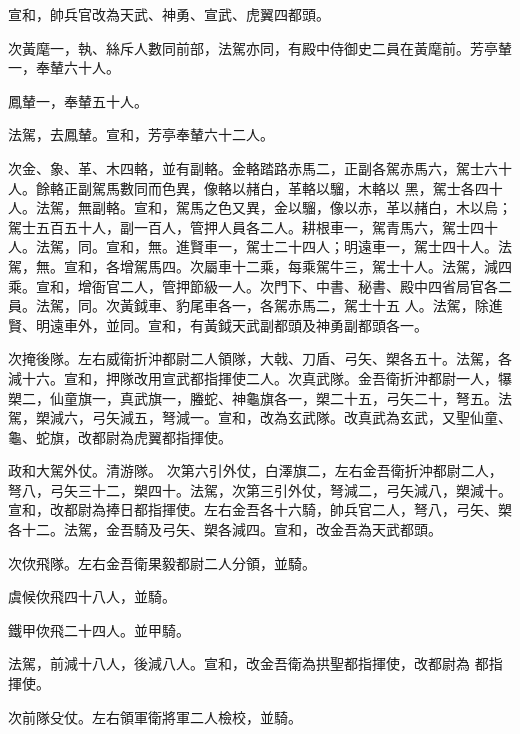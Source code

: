 \begin{pinyinscope}
 宣和，帥兵官改為天武、神勇、宣武、虎翼四都頭。



 次黃麾一，執、絲斥人數同前部，法駕亦同，有殿中侍御史二員在黃麾前。芳亭輦一，奉輦六十人。



 鳳輦一，奉輦五十人。



 法駕，去鳳輦。宣和，芳亭奉輦六十二人。



 次金、象、革、木四輅，並有副輅。金輅踏路赤馬二，正副各駕赤馬六，駕士六十人。餘輅正副駕馬數同而色異，像輅以赭白，革輅以騮，木輅以
 黑，駕士各四十人。法駕，無副輅。宣和，駕馬之色又異，金以騮，像以赤，革以赭白，木以烏；駕士五百五十人，副一百人，管押人員各二人。耕根車一，駕青馬六，駕士四十人。法駕，同。宣和，無。進賢車一，駕士二十四人；明遠車一，駕士四十人。法駕，無。宣和，各增駕馬四。次屬車十二乘，每乘駕牛三，駕士十人。法駕，減四乘。宣和，增衙官二人，管押節級一人。次門下、中書、秘書、殿中四省局官各二員。法駕，同。次黃鉞車、豹尾車各一，各駕赤馬二，駕士十五
 人。法駕，除進賢、明遠車外，並同。宣和，有黃鉞天武副都頭及神勇副都頭各一。



 次掩後隊。左右威衛折沖都尉二人領隊，大戟、刀盾、弓矢、槊各五十。法駕，各減十六。宣和，押隊改用宣武都指揮使二人。次真武隊。金吾衛折沖都尉一人，犦槊二，仙童旗一，真武旗一，螣蛇、神龜旗各一，槊二十五，弓矢二十，弩五。法駕，槊減六，弓矢減五，弩減一。宣和，改為玄武隊。改真武為玄武，又聖仙童、龜、蛇旗，改都尉為虎翼都指揮使。



 政和大駕外仗。清游隊。
 次第六引外仗，白澤旗二，左右金吾衛折沖都尉二人，弩八，弓矢三十二，槊四十。法駕，次第三引外仗，弩減二，弓矢減八，槊減十。宣和，改都尉為捧日都指揮使。左右金吾各十六騎，帥兵官二人，弩八，弓矢、槊各十二。法駕，金吾騎及弓矢、槊各減四。宣和，改金吾為天武都頭。



 次佽飛隊。左右金吾衛果毅都尉二人分領，並騎。



 虞候佽飛四十八人，並騎。



 鐵甲佽飛二十四人。並甲騎。



 法駕，前減十八人，後減八人。宣和，改金吾衛為拱聖都指揮使，改都尉為
 都指揮使。



 次前隊殳仗。左右領軍衛將軍二人檢校，並騎。




\end{pinyinscope}
